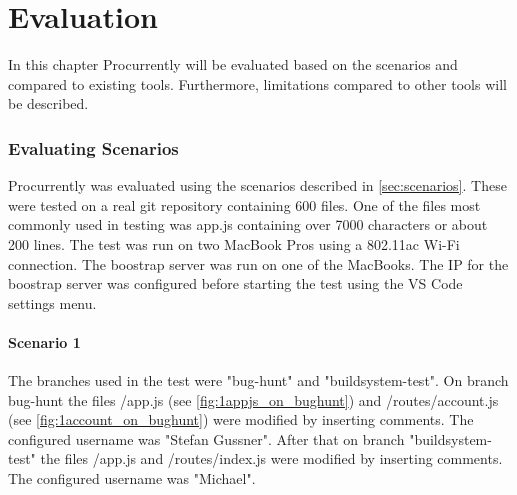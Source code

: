 \chapter{Evaluation}
\label{sec:results}

In this chapter Procurrently will be evaluated based on the scenarios and compared to existing tools.
Furthermore, limitations compared to other tools will be described.

\subsection{Evaluating Scenarios}

Procurrently was evaluated using the scenarios described in \autoref{sec:scenarios}.
These were tested on a real git repository containing 600 files. One of the files most commonly used in testing was app.js containing over 7000 characters or about 200 lines. The test was run on two MacBook Pros using a 802.11ac Wi-Fi connection.
The boostrap server was run on one of the MacBooks. The IP for the boostrap server was configured before starting the test using the VS Code settings menu. 

\subsubsection{Scenario 1}

The branches used in the test were "bug-hunt" and "buildsystem-test". On branch bug-hunt the files /app.js (see \autoref{fig:1appjs_on_bughunt}) and /routes/account.js (see \autoref{fig:1account_on_bughunt}) were modified by inserting comments. The configured username was "Stefan Gussner". 
After that on branch "buildsystem-test" the files /app.js and /routes/index.js were modified by inserting comments. The configured username was "Michael".

